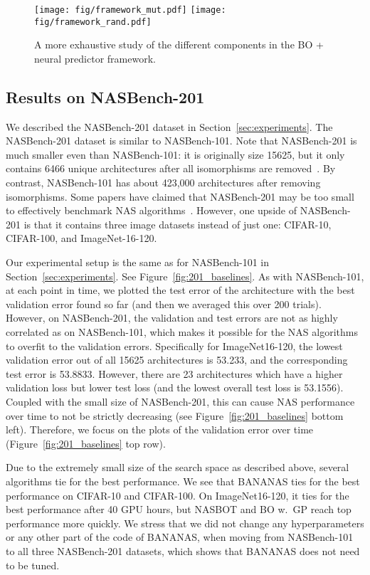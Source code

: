 \documentclass[11pt]{article}
\numberwithin{equation}{section}
\numberwithin{figure}{section}
\theoremstyle{plain}
\theoremstyle{definition}
\let\citep\cite
\begin{document}
\begin{figure*}
  \centering
    \texttt{[image: fig/framework\_mut.pdf]}
\texttt{[image: fig/framework\_rand.pdf]}
\caption{A more exhaustive study of the different components in the 
BO + neural predictor framework.}
  \label{fig:framework_study}
\end{figure*}


\subsection{Results on NASBench-201}\label{app:experiments:201}
We described the NASBench-201 dataset in Section~\ref{sec:experiments}.
The NASBench-201 dataset is similar to NASBench-101. 
Note that NASBench-201 is much smaller even than NASBench-101: it is originally 
size 15625, but it only contains 6466 unique architectures after all isomorphisms
are removed~\citep{nasbench201}. 
By contrast, NASBench-101 has about 423,000 architectures after removing
isomorphisms. Some papers have claimed that NASBench-201 may be too small to effectively
benchmark NAS algorithms~\cite{white2020local}.
However, one upside of NASBench-201 is that it contains three image datasets instead of
just one: CIFAR-10, CIFAR-100, and ImageNet-16-120.

Our experimental setup is the same as for NASBench-101 in Section~\ref{sec:experiments}.
See Figure~\ref{fig:201_baselines}.
As with NASBench-101, at each point in time, we plotted the test error of the architecture
with the best validation error found so far (and then we averaged this over 200 trials).
However, on NASBench-201, the validation and test errors are not as highly correlated
as on NASBench-101, which makes it possible for the NAS algorithms to overfit to the
validation errors. Specifically for ImageNet16-120, the lowest validation error
out of all 15625 architectures is 53.233, and the corresponding test error is
53.8833. However, there are 23 architectures which have a higher validation loss but
lower test loss (and the lowest overall test loss is 53.1556).
Coupled with the small size of NASBench-201, this can cause NAS performance over time
to not be strictly decreasing (see Figure~\ref{fig:201_baselines} bottom left).
Therefore, we focus on the plots of the validation error over time 
(Figure~\ref{fig:201_baselines} top row).

Due to the extremely small size of the search space as described above, several algorithms
tie for the best performance. We see that BANANAS ties for the best performance on
CIFAR-10 and CIFAR-100. On ImageNet16-120, it ties for the best performance after 40 GPU
hours, but NASBOT and BO w.\ GP reach top performance more quickly.
We stress that we did not change any hyperparameters or any other part of the code of BANANAS,
when moving from NASBench-101 to all three NASBench-201 datasets, which shows that
BANANAS does not need to be tuned.
\end{document}
